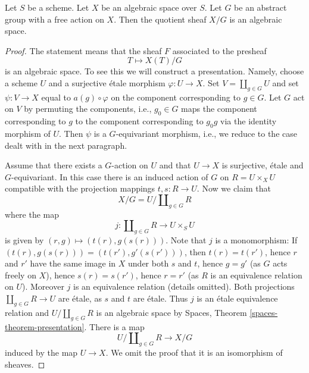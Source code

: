 \begin{lemma}
\label{lemma-quotient}
Let $S$ be a scheme.
Let $X$ be an algebraic space over $S$.
Let $G$ be an abstract group with a free action on $X$.
Then the quotient sheaf $X/G$ is an algebraic space.
\end{lemma}

\begin{proof}
The statement means that the sheaf $F$ associated to the presheaf
$$
T \longmapsto X(T)/G
$$
is an algebraic space. To see this we will construct a presentation.
Namely, choose a scheme $U$ and a surjective \'etale morphism
$\varphi : U \to X$. Set $V = \coprod_{g \in G} U$ and set
$\psi : V \to X$ equal to $a(g) \circ \varphi$ on the component corresponding
to $g \in G$. Let $G$ act on $V$ by permuting the components, i.e.,
$g_0 \in G$ maps the component corresponding to $g$ to the component
corresponding to $g_0g$ via the identity morphism of $U$.
Then $\psi$ is a $G$-equivariant morphism, i.e., we reduce to the
case dealt with in the next paragraph.

\medskip\noindent
Assume that there exists a $G$-action on $U$ and that $U \to X$ is surjective,
\'etale and $G$-equivariant. In this case there is an induced
action of $G$ on $R = U \times_X U$ compatible with the projection
mappings $t, s : R \to U$. Now we claim that
$$
X/G = U/\coprod\nolimits_{g \in G} R
$$
where the map
$$
j : \coprod\nolimits_{g \in G} R
\longrightarrow
U \times_S U
$$
is given by $(r, g) \mapsto (t(r), g(s(r)))$. Note that $j$ is a monomorphism:
If $(t(r), g(s(r))) = (t(r'), g'(s(r')))$, then
$t(r) = t(r')$, hence $r$ and $r'$ have the same image in $X$ under
both $s$ and $t$, hence $g = g'$ (as $G$ acts freely on $X$), hence
$s(r) = s(r')$, hence $r = r'$ (as $R$ is an equivalence relation on $U$).
Moreover $j$ is an equivalence relation (details omitted).
Both projections $\coprod\nolimits_{g \in G} R \to U$ are \'etale, as
$s$ and $t$ are \'etale. Thus $j$ is an \'etale equivalence relation
and $U/\coprod\nolimits_{g \in G} R$ is an algebraic space by
Spaces, Theorem \ref{spaces-theorem-presentation}.
There is a map
$$
U/\coprod\nolimits_{g \in G} R \longrightarrow X/G
$$
induced by the map $U \to X$. We omit the proof that it is an
isomorphism of sheaves.
\end{proof}












